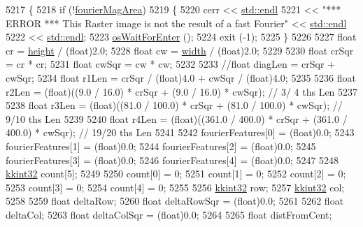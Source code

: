 \begin{DoxyCode}
5217 \{
5218   \textcolor{keywordflow}{if}  (!\hyperlink{class_k_k_b_1_1_raster_adc50969a106f5b57aca3a9ce512df0ce}{fourierMagArea})
5219   \{
5220      cerr << \hyperlink{namespace_k_k_b_ad1f50f65af6adc8fa9e6f62d007818a8}{std::endl}
5221           << \textcolor{stringliteral}{"*** ERROR ***    This Raster image is not the result of a fast Fourier"} << 
      \hyperlink{namespace_k_k_b_ad1f50f65af6adc8fa9e6f62d007818a8}{std::endl}
5222           << \hyperlink{namespace_k_k_b_ad1f50f65af6adc8fa9e6f62d007818a8}{std::endl};
5223      \hyperlink{namespace_k_k_b_a255aa69aade7f429585349d08973e09f}{osWaitForEnter} ();
5224      exit (-1);
5225   \}
5226 
5227   \textcolor{keywordtype}{float}  cr = \hyperlink{class_k_k_b_1_1_raster_af39ff189de4fbb6de98392e187efafb7}{height} / (float)2.0;
5228   \textcolor{keywordtype}{float}  cw = \hyperlink{class_k_k_b_1_1_raster_ae0bcc103e191c3421d7692dc69ceb554}{width}  / (float)2.0;
5229 
5230   \textcolor{keywordtype}{float}  crSqr = cr * cr;
5231   \textcolor{keywordtype}{float}  cwSqr = cw * cw;
5232 
5233   \textcolor{comment}{//float  diagLen = crSqr + cwSqr;}
5234   \textcolor{keywordtype}{float}  r1Len = crSqr / (float)4.0 + cwSqr / (\textcolor{keywordtype}{float})4.0;
5235 
5236   \textcolor{keywordtype}{float}  r2Len = (float)((9.0   /  16.0) * crSqr + (9.0   /  16.0) * cwSqr);  \textcolor{comment}{//  3/ 4 ths Len}
5237 
5238   \textcolor{keywordtype}{float}  r3Len = (float)((81.0  / 100.0) * crSqr + (81.0  / 100.0) * cwSqr);  \textcolor{comment}{//  9/10 ths Len}
5239 
5240   \textcolor{keywordtype}{float}  r4Len = (float)((361.0 / 400.0) * crSqr + (361.0 / 400.0) * cwSqr);  \textcolor{comment}{// 19/20 ths Len}
5241 
5242   fourierFeatures[0] = (float)0.0;
5243   fourierFeatures[1] = (float)0.0;
5244   fourierFeatures[2] = (float)0.0;
5245   fourierFeatures[3] = (float)0.0;
5246   fourierFeatures[4] = (float)0.0;
5247 
5248   \hyperlink{namespace_k_k_b_a8fa4952cc84fda1de4bec1fbdd8d5b1b}{kkint32}  count[5];
5249 
5250   count[0] = 0;
5251   count[1] = 0;
5252   count[2] = 0;
5253   count[3] = 0;
5254   count[4] = 0;
5255 
5256   \hyperlink{namespace_k_k_b_a8fa4952cc84fda1de4bec1fbdd8d5b1b}{kkint32}  row;
5257   \hyperlink{namespace_k_k_b_a8fa4952cc84fda1de4bec1fbdd8d5b1b}{kkint32}  col;
5258 
5259   \textcolor{keywordtype}{float}  deltaRow;
5260   \textcolor{keywordtype}{float}  deltaRowSqr = (float)0.0;
5261 
5262   \textcolor{keywordtype}{float}  deltaCol;
5263   \textcolor{keywordtype}{float}  deltaColSqr = (float)0.0;
5264 
5265   \textcolor{keywordtype}{float}  distFromCent;

\end{DoxyCode}
